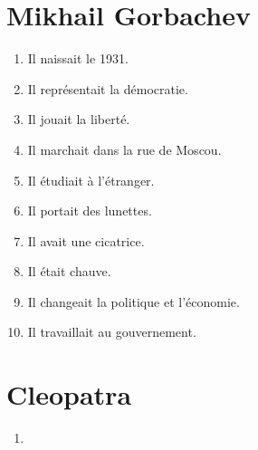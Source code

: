 \section*{Mikhail Gorbachev}

\begin{enumerate}
    \item Il naissait le 1931.                    
    \item Il représentait la démocratie.                         
    \item Il jouait la liberté.             
    \item Il marchait dans la rue de Moscou.                
    \item Il étudiait à l'étranger.        
    \item Il portait des lunettes.      
    \item Il avait une cicatrice.
    \item Il était chauve.               
    \item Il changeait la politique et l'économie.          
    \item Il travaillait au gouvernement.             
\end{enumerate}

\section*{Cleopatra}

\begin{enumerate}
    \item 
\end{enumerate}
